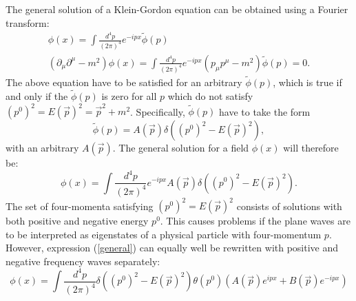 \documentclass[11pt]{article}
\numberwithin{equation}{section}
\begin{document}
     The general solution of a Klein-Gordon equation can be obtained using a Fourier transform:
     \begin{gather}
       \phi(x) = \int\frac{d^4 p}{(2\pi)^4} e^{-ipx} \tilde \phi(p)\\
       \left( \partial_\mu \partial^\mu -  m^2 \right) \phi(x) = \int\frac{d^4 p}{(2\pi)^4} e^{-ipx} \left( p_\mu p^\mu -  m^2\right) \tilde \phi(p) = 0.
     \end{gather}
     The above equation have to be satisfied for an arbitrary $\tilde \phi(p)$, which is true if and only if the $\tilde \phi(p)$
     is zero for all $p$ which do not satisfy $\left(p^0\right)^2 = E(\vec p)^2 = \vec p ^2 + m^2$. Specifically,
     $\tilde \phi(p)$ have to take the form
     \begin{equation}
       \tilde \phi(p) = A(\vec p) \delta\left((p^0)^2 - E(\vec p)^2\right),
     \end{equation}
     with an arbitrary $A(\vec p)$.
     The general solution for a field $\phi (x)$ will therefore be: %
     \begin{equation}
       \phi(x) = \int \frac{d^4p}{(2 \pi)^4} e^{-ipx} A(\vec p) \delta\left((p^0)^2 - E(\vec p)^2\right). \label{general}
     \end{equation}
     The set of four-momenta satisfying $\left(p^0\right)^2 = E(\vec p)^2$ consists of solutions with both positive and negative energy $p^0$.
     This causes problems if the plane waves are to be interpreted as eigenstates of a physical particle with four-momentum $p$.
     However, expression (\ref{general}) can equally well be rewritten with positive and negative frequency waves separately:
     \begin{equation}
       \phi(x) = \int \frac{d^4p}{(2 \pi)^4} \delta\left((p^0)^2 - E(\vec p)^2\right) \theta(p^0) \left( A(\vec p) e^{ipx} + B(\vec p) e^{-ipx} \right)
     \end{equation}
\end{document}
